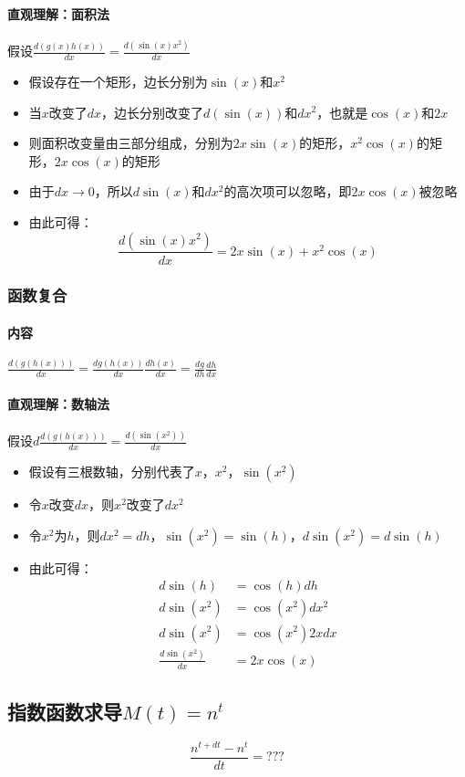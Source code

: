 \documentclass[UTF8]{ctexart}
\begin{document}
\paragraph{直观理解：面积法}
假设$\frac{d(g(x)h(x))}{dx} = \frac{d(\sin(x)x^2)}{dx}$
\begin{itemize}
	\item 假设存在一个矩形，边长分别为$\sin(x)$和$x^2$
	\item 当$x$改变了$dx$，边长分别改变了$d(\sin(x))$和$dx^2$，也就是$\cos(x)$和$2x$
	\item 则面积改变量由三部分组成，分别为$2x\sin(x)$的矩形，$x^2\cos(x)$的矩形，$2x\cos(x)$的矩形
	\item 由于$dx\to0$，所以$d\sin(x)$和$dx^2$的高次项可以忽略，即$2x\cos(x)$被忽略
	\item 由此可得：$$\frac{d(\sin(x)x^2)}{dx} = 2x\sin(x) + x^2\cos(x)$$
\end{itemize}

\subsubsection{函数复合}
\paragraph{内容}
$\frac{d(g(h(x)))}{dx} = \frac{dg(h(x))}{dx}\frac{dh(x)}{dx} = \frac{dg}{dh}\frac{dh}{dx}$
\paragraph{直观理解：数轴法}
假设$d\frac{d(g(h(x)))}{dx} = \frac{d(\sin(x^2))}{dx}$
\begin{itemize}
	\item 假设有三根数轴，分别代表了$x$，$x^2$，$\sin(x^2)$
	\item 令$x$改变$dx$，则$x^2$改变了$dx^2$
	\item 令$x^2$为$h$，则$dx^2 = dh$，$\sin(x^2)=\sin(h)$，$d\sin(x^2)=d\sin(h)$
	\item 由此可得： \begin{align*}
		d\sin(h) &= \cos(h)dh \\
		d\sin(x^2) &= \cos(x^2)dx^2 \\
		d\sin(x^2) &= \cos(x^2)2xdx \\
		\frac{d\sin(x^2)}{dx} &= 2x\cos(x) 
	\end{align*}
\end{itemize}

\subsection{指数函数求导$M(t) = n^t$}
$$\frac{n^{t+dt}-n^t}{dt} = ???$$
\end{document}
